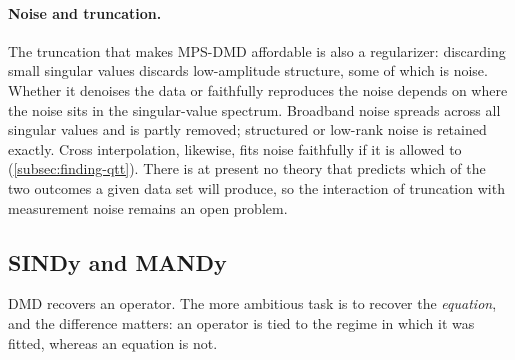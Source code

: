 \paragraph{Noise and truncation.}
The truncation that makes MPS-DMD affordable is also a regularizer: discarding
small singular values discards low-amplitude structure, some of which is noise.
Whether it denoises the data or faithfully reproduces the noise depends on where
the noise sits in the singular-value spectrum. Broadband noise spreads across
all singular values and is partly removed; structured or low-rank noise is
retained exactly. Cross interpolation, likewise, fits noise faithfully if it is
allowed to (\cref{subsec:finding-qtt}). There is at present no theory that
predicts which of the two outcomes a given data set will produce, so the
interaction of truncation with measurement noise remains an open problem.

\subsection{SINDy and MANDy}
\label{subsec:sindy-mandy}

DMD recovers an operator. The more ambitious task is to recover the
\emph{equation}, and the difference matters: an operator is tied to the regime
in which it was fitted, whereas an equation is not.

